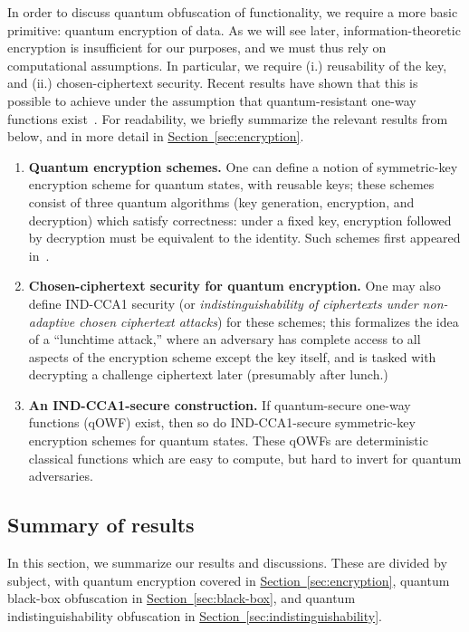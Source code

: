 \documentclass[envcountsame]{llncs}
\numberwithin{equation}{section}
\newcommand{\expref}[2]{\texorpdfstring{\hyperref[#2]{#1~\ref{#2}}}{#1~\ref{#2}}}
\begin{document}
In order to discuss quantum obfuscation of functionality, we require a more basic primitive: quantum encryption of data. As we will see later, information-theoretic encryption is insufficient for our purposes, and we must thus rely on computational assumptions. In particular, we require (i.) reusability of the key, and (ii.) chosen-ciphertext security. Recent results have shown that this is possible to achieve under the assumption that quantum-resistant one-way functions exist~\cite{ABFGSS16}. For readability, we briefly summarize the relevant results from~\cite{ABFGSS16} below, and in more detail in \expref{Section}{sec:encryption}.
\begin{enumerate}
\item \textbf{Quantum encryption schemes.} One can define a notion of symmetric-key encryption scheme for quantum states, with reusable keys; these schemes consist of three quantum algorithms (key generation, encryption, and decryption) which satisfy correctness: under a fixed key, encryption followed by decryption must be equivalent to the identity. Such schemes first appeared in~\cite{BJ15}.
\item \textbf{Chosen-ciphertext security for quantum encryption.} One may also define IND-CCA1 security (or \emph{indistinguishability of ciphertexts under non-adaptive chosen ciphertext attacks}) for these schemes; this formalizes the idea of a ``lunchtime attack,'' where an adversary has complete access to all aspects of the encryption scheme except the key itself, and is tasked with decrypting a challenge ciphertext later (presumably after lunch.) 
\item \textbf{An IND-CCA1-secure construction.} If quantum-secure one-way functions (qOWF) exist, then so do IND-CCA1-secure symmetric-key encryption schemes for quantum states. These qOWFs are deterministic classical functions which are easy to compute, but hard to invert for quantum adversaries. 
\end{enumerate}

\subsection{Summary of results}

In this section, we summarize our results and discussions. These are divided by subject, with quantum encryption covered in \expref{Section}{sec:encryption}, quantum black-box obfuscation in \expref{Section}{sec:black-box}, and quantum indistinguishability obfuscation in \expref{Section}{sec:indistinguishability}.
\end{document}
